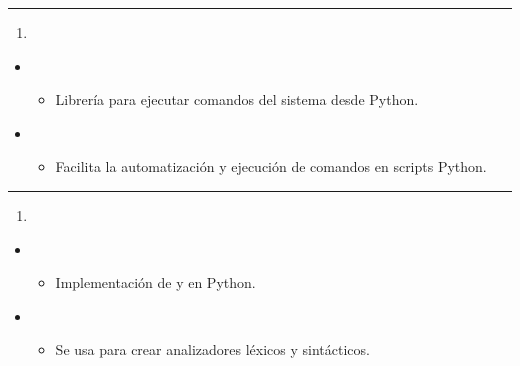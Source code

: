 \documentclass[a4paper,10pt,spanish]{sphinxmanual}
\begin{document}
\bigskip\hrule\bigskip

\begin{enumerate}
%
\setcounter{enumi}{16}
\item {} 
\sphinxAtStartPar
{}

\end{enumerate}
\begin{itemize}
\item {} 
\sphinxAtStartPar
{}
\begin{itemize}
\item {} 
\sphinxAtStartPar
Librería para ejecutar comandos del sistema desde Python.

\end{itemize}

\item {} 
\sphinxAtStartPar
{}
\begin{itemize}
\item {} 
\sphinxAtStartPar
Facilita la automatización y ejecución de comandos en scripts Python.

\end{itemize}

\end{itemize}


\bigskip\hrule\bigskip

\begin{enumerate}
%
\setcounter{enumi}{17}
\item {} 
\sphinxAtStartPar
{}

\end{enumerate}
\begin{itemize}
\item {} 
\sphinxAtStartPar
{}
\begin{itemize}
\item {} 
\sphinxAtStartPar
Implementación de  y  en Python.

\end{itemize}

\item {} 
\sphinxAtStartPar
{}
\begin{itemize}
\item {} 
\sphinxAtStartPar
Se usa para crear analizadores léxicos y sintácticos.

\end{itemize}

\end{itemize}
\end{document}
